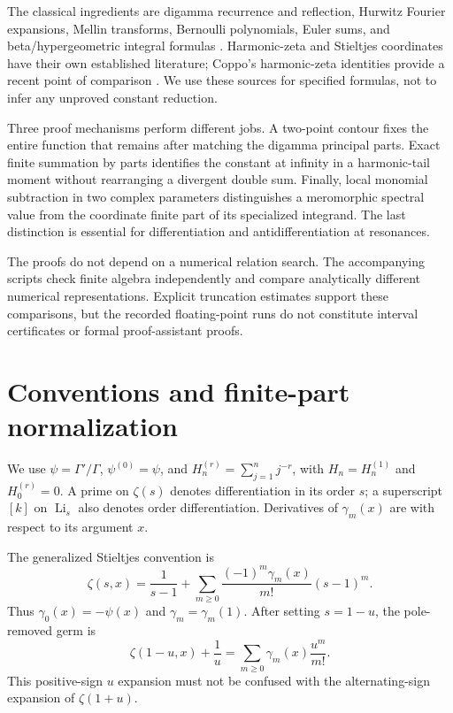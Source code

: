 \documentclass[11pt,a4paper]{article}
\numberwithin{equation}{section}
\theoremstyle{definition}
\theoremstyle{remark}
\DeclareMathOperator{\Li}{Li}
\begin{document}
The classical ingredients are digamma recurrence and reflection,
Hurwitz Fourier expansions, Mellin transforms, Bernoulli
polynomials, Euler sums, and beta/hypergeometric integral formulas
\cite{DLMF,BBG,EspinosaMoll}. Harmonic-zeta and Stieltjes
coordinates have their own established literature; Coppo's
harmonic-zeta identities provide a recent point of comparison
\cite{Coppo}. We use these sources for specified formulas, not to
infer any unproved constant reduction.

Three proof mechanisms perform different jobs. A two-point contour
fixes the entire function that remains after matching the digamma
principal parts. Exact finite summation by parts identifies the
constant at infinity in a harmonic-tail moment without rearranging
a divergent double sum. Finally, local monomial subtraction in two
complex parameters distinguishes a meromorphic spectral value
from the coordinate finite part of its specialized integrand.
The last distinction is essential for differentiation and
antidifferentiation at resonances.

The proofs do not depend on a numerical relation search. The
accompanying scripts check finite algebra independently and compare
analytically different numerical representations. Explicit
truncation estimates support these comparisons, but the recorded
floating-point runs do not constitute interval certificates or
formal proof-assistant proofs.




\section{Conventions and finite-part normalization}
\label{conv:section}

We use $\psi=\Gamma'/\Gamma$, $\psi^{(0)}=\psi$, and
$H_n^{(r)}=\sum_{j=1}^n j^{-r}$, with $H_n=H_n^{(1)}$ and
$H_0^{(r)}=0$. A prime on $\zeta(s)$ denotes differentiation
in its order $s$; a superscript $[k]$ on $\Li_s$ also denotes
order differentiation. Derivatives of $\gamma_m(x)$ are with
respect to its argument $x$.

The generalized Stieltjes convention is
\begin{equation}\label{conv:stieltjes}
\zeta(s,x)=\frac1{s-1}+
\sum_{m\ge0}\frac{(-1)^m\gamma_m(x)}{m!}(s-1)^m.
\end{equation}
Thus $\gamma_0(x)=-\psi(x)$ and
$\gamma_m=\gamma_m(1)$. After setting $s=1-u$, the pole-removed
germ is
\[
\zeta(1-u,x)+\frac1u
=\sum_{m\ge0}\gamma_m(x)\frac{u^m}{m!}.
\]
This positive-sign $u$ expansion must not be confused with the
alternating-sign expansion of $\zeta(1+u)$.
\end{document}
